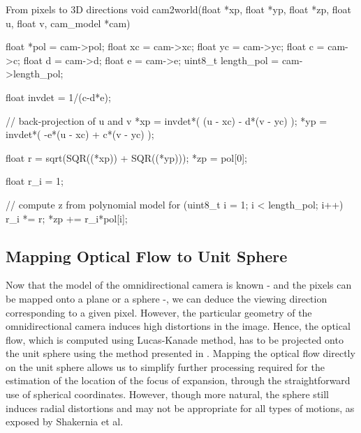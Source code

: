\begin{codeframe}[colback=white, label=code:cameraModel]{From pixels to 3D directions}
void cam2world(float *xp, float *yp, float *zp, float u, 
		float v, cam_model *cam)
{
	 float *pol    = cam->pol;
	 float xc      = cam->xc;
	 float yc      = cam->yc; 
	 float c       = cam->c;
	 float d       = cam->d;
	 float e       = cam->e;
	 uint8_t length_pol = cam->length_pol;

	 float invdet  = 1/(c-d*e);

	 // back-projection of u and v
	 *xp = invdet*(    (u - xc) - d*(v - yc) );
	 *yp = invdet*( -e*(u - xc) + c*(v - yc) );
	  
	 float r = sqrt(SQR((*xp)) + SQR((*yp)));
	 *zp  	 = pol[0];
	 
	 float r_i = 1;
	 
	 // compute z from polynomial model
	 for (uint8_t i = 1; i < length_pol; i++)
	 {
	   r_i *= r;
	   *zp += r_i*pol[i];
	 }
}
\end{codeframe}

\subsection{Mapping Optical Flow to Unit Sphere}
Now that the model of the omnidirectional camera is known - and the pixels can be mapped onto a plane or a sphere -, we can deduce the viewing direction corresponding to a given pixel. However, the particular geometry of the omnidirectional camera induces high distortions in the image. Hence, the optical flow, which is computed using Lucas-Kanade method, has to be projected onto the unit sphere using the method presented in \cite{backproj}. Mapping the optical flow directly on the unit sphere allows us to simplify further processing required for the estimation of the location of the focus of expansion, through the straightforward use of spherical coordinates. However, though more natural, the sphere still induces radial distortions and may not be appropriate for all types of motions, as exposed by Shakernia et al.

